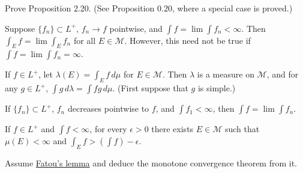 	\begin{exercise}[Folland 2.12]
		Prove Proposition 2.20. (See Proposition 0.20, where a special case is proved.)
	\end{exercise}
	\begin{solution}

	\end{solution}

	\begin{exercise}[Folland 2.13]
		Suppose $\{f_n\} \subset L^+$, $f_n \to f$ pointwise, and $\int f = \lim \int f_n < \infty$. Then $\int_E f = \lim \int_E f_n$ for all $E \in \mathcal{M}$. However, this need not be true if $\int f = \lim \int f_n = \infty$.
	\end{exercise}
	\begin{solution}

	\end{solution}

	\begin{exercise}[Folland 2.14]
		If $f \in L^+$, let $\lambda(E) = \int_E f \, d\mu$ for $E \in \mathcal{M}$. Then $\lambda$ is a measure on $\mathcal{M}$, and for any $g \in L^+$, $\int g \, d\lambda = \int fg \, d\mu$. (First suppose that $g$ is simple.)
	\end{exercise}
	\begin{solution}

	\end{solution}

	\begin{exercise}[Folland 2.15]
		If $\{f_n\} \subset L^+$, $f_n$ decreases pointwise to $f$, and $\int f_1 < \infty$, then $\int f = \lim \int f_n$.
	\end{exercise}
	\begin{solution}

	\end{solution}

	\begin{exercise}[Folland 2.16]
		If $f \in L^+$ and $\int f < \infty$, for every $\epsilon > 0$ there exists $E \in \mathcal{M}$ such that $\mu(E) < \infty$ and $\int_E f > (\int f) - \epsilon$.
	\end{exercise}
	\begin{solution}

	\end{solution}

	\begin{exercise}[Folland 2.17]
		Assume \hyperref[thm:fatous-lemma]{Fatou's lemma} and deduce the monotone convergence theorem from it.
	\end{exercise}
	\begin{solution}

	\end{solution}

